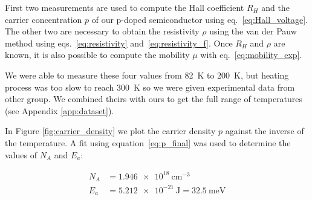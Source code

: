 \documentclass[11pt,a4paper]{article}
\begin{document}
First two measurements are used to compute the Hall coefficient $R_H$ and the carrier concentration $p$ of our p-doped semiconductor using eq.~\eqref{eq:Hall_voltage}. The other two are necessary to obtain the resistivity $\rho$ using the van der Pauw method using eqs.~\eqref{eq:resistivity} and~\eqref{eq:resistivity_f}. Once $R_H$ and $\rho$ are known, it is also possible to compute the mobility $\mu$ with eq.~\eqref{eq:mobility_exp}.

We were able to measure these four values from \SI{82}{\kelvin} to \SI{200}{\kelvin}, but heating process was too slow to reach \SI{300}{\kelvin} so we were given experimental data from other group. We combined theirs with ours to get the full range of temperatures (see Appendix \ref{app:dataset}).

%

In Figure \ref{fig:carrier_density} we plot the carrier density $p$ against the inverse of the temperature. A fit using equation~\eqref{eq:p_final} was used to determine the values of $N_A$ and $E_a$:

\begin{align*}
N_A&=\SI{1.946e18}{\centi\meter^{-3}}\\
E_a&=\SI{5.212e-21}{\joule}=\SI{32.5}{\milli\eV}
\end{align*}
\end{document}
